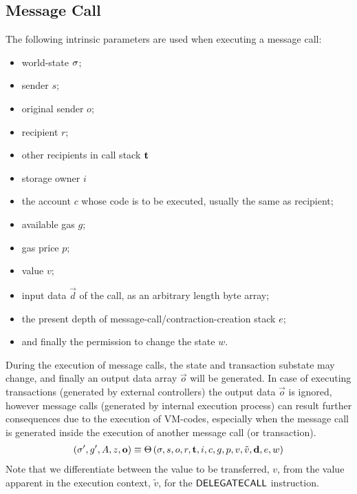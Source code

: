\subsection{Message Call}\label{sec:execution}
The following intrinsic parameters are used when executing a message call:
\begin{itemize}[nosep]
	\item world-state ${\mathbf{\sigma}}$;
	
	\item sender $s$;

	\item original sender $o$;

	\item recipient $r$;
	
	\item other recipients in call stack ${\bf t}$
	
	\item storage owner $i$

	\item the account $c$ whose code is to be executed, usually the same as recipient; 

	\item available gas $g$;

	\item gas price $p$;

	\item value $v$;

	\item input data $\vec{d}$ of the call, as an arbitrary length byte array;

	\item the present depth of message-call/contraction-creation stack $e$;

	\item and finally the permission to change the state $w$.
\end{itemize}

During the execution of message calls, 
the state and transaction substate may change,
and finally an output data array $\vec{o}$ will be generated.
In case of executing transactions (generated by external controllers) the output data $\vec{o}$ is ignored, however message calls (generated by internal execution process) can result further consequences due to the execution of VM-codes, especially when the message call is generated inside the execution of another message call (or transaction).
\begin{align}
  	\left(\mathbf{\sigma}', g', A, z, \mathbf{o} \right) \equiv \mathrm{\Theta}\left(\mathbf{\sigma},s,o,r,\mathbf{t},i,c,g, p,v,\tilde{v},\mathbf{d},e,w \right)
\end{align}  
Note that we differentiate between the value to be transferred, $v$, from the value apparent in the execution context, $\tilde{v}$, for the $\mathsf{DELEGATECALL}$ instruction.

